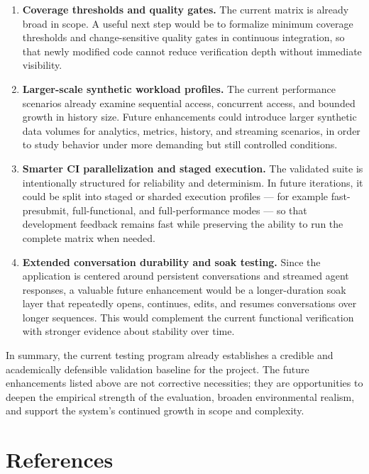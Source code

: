 \documentclass[11pt,a4paper]{report}
\begin{document}
\begin{enumerate}
  \item \textbf{Coverage thresholds and quality gates.} The current matrix is already broad in scope. A useful next step would be to formalize minimum coverage thresholds and change-sensitive quality gates in continuous integration, so that newly modified code cannot reduce verification depth without immediate visibility.
  \item \textbf{Larger-scale synthetic workload profiles.} The current performance scenarios already examine sequential access, concurrent access, and bounded growth in history size. Future enhancements could introduce larger synthetic data volumes for analytics, metrics, history, and streaming scenarios, in order to study behavior under more demanding but still controlled conditions.
  \item \textbf{Smarter CI parallelization and staged execution.} The validated suite is intentionally structured for reliability and determinism. In future iterations, it could be split into staged or sharded execution profiles --- for example fast-presubmit, full-functional, and full-performance modes --- so that development feedback remains fast while preserving the ability to run the complete matrix when needed.
  \item \textbf{Extended conversation durability and soak testing.} Since the application is centered around persistent conversations and streamed agent responses, a valuable future enhancement would be a longer-duration soak layer that repeatedly opens, continues, edits, and resumes conversations over longer sequences. This would complement the current functional verification with stronger evidence about stability over time.
\end{enumerate}

In summary, the current testing program already establishes a credible and
academically defensible validation baseline for the project. The future
enhancements listed above are not corrective necessities; they are
opportunities to deepen the empirical strength of the evaluation, broaden
environmental realism, and support the system's continued growth in scope
and complexity.

\chapter{References}
\end{document}
